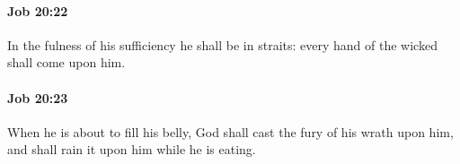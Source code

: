 		\paragraph{Job 20:22} %
			\label{JOB-20-22}

			In the fulness of his sufficiency he shall be in straits: every hand of the wicked shall come upon him.


		\paragraph{Job 20:23} %
			\label{JOB-20-23}

			When he is about to fill his belly, God shall cast the fury of his wrath upon him, and shall rain it upon him while he is eating.


